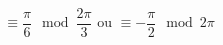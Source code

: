 \begin{displaymath}
\equiv \frac{\pi}{6} \mod \frac{2\pi}{ 3}
\text{ ou }
\equiv -\frac{\pi}{2} \mod 2\pi
\end{displaymath}
